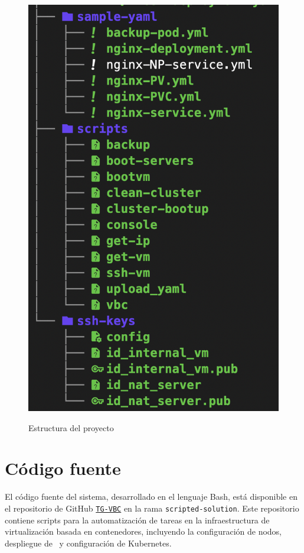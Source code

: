 \begin{figure}[H]
\begin{minipage}{0.48\textwidth}
        \includegraphics[scale=0.35]{tablas-images/cp6/src/tree-2.png}
        \label{fig:estructura-proyecto-2}
    \end{minipage}
    \caption{Estructura del proyecto}\label{fig:estructura-proyecto}
\end{figure}

\section{Código fuente}\label{sec:automatizacion-scripts}
\noindent
El código fuente del sistema, desarrollado en el lenguaje Bash, está disponible en el repositorio de GitHub \href{https://github.com/AariazP/TG-VBC.git}{\texttt{TG-VBC}} en la rama \texttt{scripted-solution}. Este repositorio contiene scripts para la automatización de tareas en la infraestructura de virtualización basada en contenedores, incluyendo la configuración de nodos, despliegue de \VM\ y configuración de Kubernetes. 

